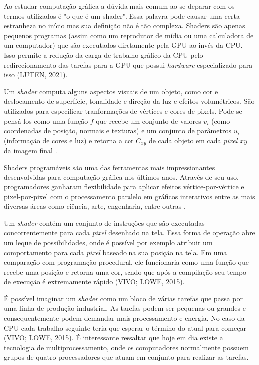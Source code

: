 Ao estudar computação gráfica a dúvida mais comum ao se deparar com os termos utilizados é "o que é um shader". Essa palavra pode causar uma certa estranheza no início mas sua definição não é tão complexa. Shaders são apenas pequenos programas (assim como um reprodutor de mídia ou uma calculadora de um computador) que são executados diretamente pela \acrshort{GPU} ao invés da \acrshort{CPU}. Isso permite a redução da carga de trabalho gráfico da \acrshort{CPU} pelo redirecionamento das tarefas para a \acrshort{GPU} que possui \textit{hardware} especializado para isso (LUTEN, 2021)\nocite{openGLBook}.

Um \textit{shader} computa alguns aspectos visuais de um objeto, como cor e deslocamento de superfície, tonalidade e direção da luz e efeitos volumétricos. São utilizados para especificar tranformações de vértices e cores de pixels. Pode-se pensá-los como uma função $ f $ que recebe um conjunto de valores $ v_i $ (como coordenadas de posição, normais e texturas) e um conjunto de parâmetros $ u_i $ (informação de cores e luz) e retorna a cor $ C_{xy} $ de cada objeto em cada \textit{pixel} $ xy $ da imagem final \cite{fabio2005user}. 

Shaders programáveis são uma das ferramentas mais impressionantes desenvolvidas para computação gráfica nos últimos anos. Através de seu uso, programadores ganharam flexibilidade para aplicar efeitos vértice-por-vértice e pixel-por-pixel com o processamento paralelo em gráficos interativos entre as mais diversas áreas como ciência, arte, engenharia, entre outras \cite{bailey2007}.

Um \textit{shader} contém um conjunto de instruções que são executadas concorrentemente para cada \textit{pixel} desenhado na tela. Essa forma de operação abre um leque de possibilidades, onde é possível por exemplo atribuir um comportamento para cada \textit{pixel} baseado na sua posição na tela. Em uma comparação com programação procedural, ele funcionaria como uma função que recebe uma posição e retorna uma cor, sendo que após a compilação seu tempo de execução é extremamente rápido (VIVO; LOWE, 2015)\nocite{bookOfShaders}.

É possível imaginar um \textit{shader} como um bloco de várias tarefas que passa por uma linha de produção industrial. As tarefas podem ser pequenas ou grandes e consequentemente podem demandar mais processamento e energia. No caso da CPU cada trabalho seguinte teria que esperar o término do atual para começar (VIVO; LOWE, 2015)\nocite{bookOfShaders}. É interessante ressaltar que hoje em dia existe a tecnologia de multiprocessamento, onde os computadores normalmente possuem grupos de quatro processadores que atuam em conjunto para realizar as tarefas.

